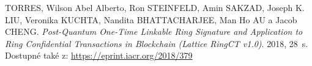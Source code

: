 \begin{thebibliography}{99}

  TORRES, Wilson Abel Alberto, Ron STEINFELD, Amin SAKZAD, Joseph K. LIU, Veronika KUCHTA, Nandita BHATTACHARJEE, Man Ho AU a Jacob CHENG. \textit{Post-Quantum One-Time Linkable Ring Signature and Application to Ring Confidential Transactions in Blockchain (Lattice RingCT v1.0)}. 2018, 28~s. Dostupné také z: \url{https://eprint.iacr.org/2018/379}


\end{thebibliography}